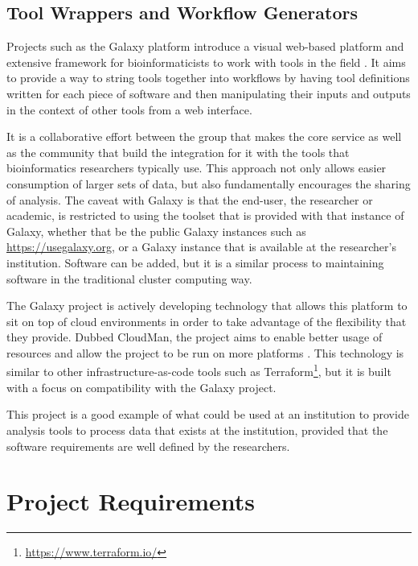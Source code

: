 \subsection{Tool Wrappers and Workflow Generators}

Projects such as the Galaxy platform introduce a visual web-based platform and extensive framework for bioinformaticists to work with tools in the field \parencite{afgan2016galaxy}. It aims to provide a way to string tools together into workflows by having tool definitions written for each piece of software and then manipulating their inputs and outputs in the context of other tools from a web interface.

It is a collaborative effort between the group that makes the core service as well as the community that build the integration for it with the tools that bioinformatics researchers typically use. This approach not only allows easier consumption of larger sets of data, but also fundamentally encourages the sharing of analysis. The caveat with Galaxy is that the end-user, the researcher or academic, is restricted to using the toolset that is provided with that instance of Galaxy, whether that be the public Galaxy instances such as \url{https://usegalaxy.org}, or a Galaxy instance that is available at the researcher's institution. Software can be added, but it is a similar process to maintaining software in the traditional cluster computing way.

The Galaxy project is actively developing technology that allows this platform to sit on top of cloud environments in order to take advantage of the flexibility that they provide. Dubbed CloudMan, the project aims to enable better usage of resources and allow the project to be run on more platforms \parencite{afgan2012cloudman}. This technology is similar to other infrastructure-as-code tools such as Terraform\footnote{\url{https://www.terraform.io/}}, but it is built with a focus on compatibility with the Galaxy project.

This project is a good example of what could be used at an institution to provide analysis tools to process data that exists at the institution, provided that the software requirements are well defined by the researchers.


\section{Project Requirements}

